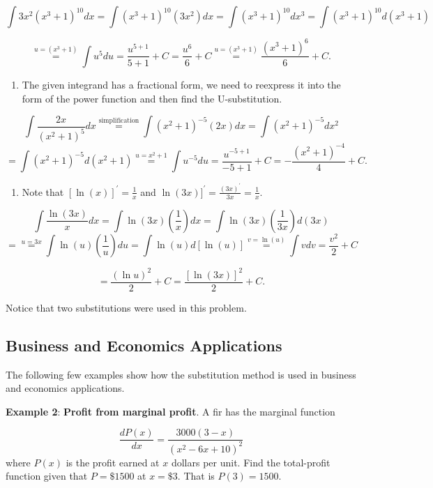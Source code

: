 \documentclass[
]{book}
\providecommand{\tightlist}{%
  \setlength{\itemsep}{0pt}\setlength{\parskip}{0pt}}
\begin{document}
\[
\int3x^2(x^3+1)^{10}dx = \int(x^3+1)^{10} (3x^2)dx = \int(x^3+1)^{10}dx^3 = \int(x^3+1)^{10}d(x^3+1)
\]

\[
\stackrel{u = (x^3+1)}{=} \int u^5du = \frac{u^{5+1}}{5+1} + C = \frac{u^6}{6}+C \stackrel{u = (x^3+1)}{=} \frac{(x^3+1)^6}{6} + C.
\]

\begin{enumerate}
\def\labelenumi{\arabic{enumi}.}
\setcounter{enumi}{2}
\tightlist
\item
  The given integrand has a fractional form, we need to reexpress it into the form of the power function and then find the U-substitution.
\end{enumerate}

\[
\int\frac{2x}{(x^2+1)^5}dx \stackrel{\text{simplification}}{=} \int (x^2+1)^{-5}(2x)dx = \int (x^2+1)^{-5}dx^2
\]
\[
=\int (x^2+1)^{-5}d(x^2+1) \stackrel{u=x^2+1}{=} \int u^{-5} du = \frac{u^{-5 + 1}}{-5+1}+C = -\frac{(x^2+1)^{-4}}{4}+C.
\]

\begin{enumerate}
\def\labelenumi{\arabic{enumi}.}
\setcounter{enumi}{3}
\tightlist
\item
  Note that \([\ln (x)]^\prime = \frac{1}{x}\) and \(\ln (3x)]^\prime = \frac{(3x)^\prime}{3x}=\frac{1}{x}\).
\end{enumerate}

\[
\int\frac{\ln(3x)}{x}dx =\int \ln (3x) \left( \frac{1}{x}\right)dx = \int \ln (3x) \left( \frac{1}{3x}\right)d(3x)
\]
\[
= \stackrel{u=3x}{=} \int \ln (u) \left( \frac{1}{u}\right)du = \int \ln(u) d[\ln(u)] \stackrel{v=\ln(u)}{=}\int vdv=\frac{v^2}{2}+C
\]

\[
=\frac{(\ln u)^2}{2} + C = \frac{[\ln(3x)]^2}{2} + C.
\]

Notice that two substitutions were used in this problem.

\hfill\break

\hypertarget{business-and-economics-applications}{%
\subsection{Business and Economics Applications}\label{business-and-economics-applications}}

The following few examples show how the substitution method is used in business and economics applications.

\textbf{Example 2}: \textbf{Profit from marginal profit}. A fir has the marginal function

\[
\frac{dP(x)}{dx} = \frac{3000(3-x)}{(x^2-6x+10)^2}
\]
where \(P(x)\) is the profit earned at \(x\) dollars per unit. Find the total-profit function given that \(P = \$1500\) at \(x = \$3\). That is \(P(3) = 1500\).
\end{document}
